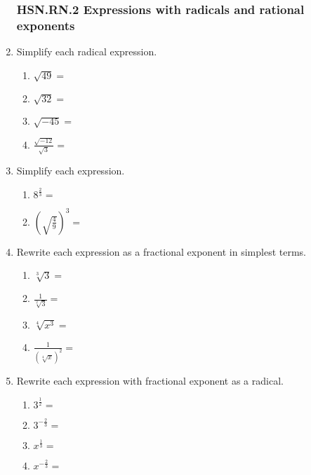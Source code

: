 \documentclass[12pt, twoside]{article}
\begin{document}
\begin{enumerate}[itemsep=0.5cm]
\subsubsection*{HSN.RN.2 Expressions with radicals and rational exponents}
\item Simplify each radical expression.
    \begin{multicols}{2}
    \begin{enumerate}[itemsep=0.5cm]
        \item $\sqrt{49}=$
        \item $\sqrt{32}=$
        \item $\sqrt{-45}=$
        \item $\displaystyle \frac{\sqrt{-12}}{\sqrt{3}}=$
    \end{enumerate}
    \end{multicols} \vspace{1cm}
    
\item Simplify each expression.
    \begin{multicols}{2}
    \begin{enumerate}[itemsep=0.5cm]
        \item $\displaystyle 8^{\frac{2}{3}} =$
        \item $\left( \sqrt{\frac{4}{9}} \right)^{3} =$
    \end{enumerate}
    \end{multicols} \vspace{2cm}

    
\item Rewrite each expression as a fractional exponent in simplest terms.
    \begin{multicols}{2}
      \begin{enumerate}[itemsep=1cm]
          \item $\sqrt[3]{3} =$
          \item $\displaystyle \frac{1}{\sqrt[2]{3}}=$
          \item $\sqrt[4]{x^3} =$
          \item $\displaystyle \frac{1}{(\sqrt[4]{x})^2}=$
      \end{enumerate}
      \end{multicols} \vspace{1cm}
  
\item Rewrite each expression with fractional exponent as a radical.
    \begin{multicols}{2}
      \begin{enumerate}[itemsep=1cm]
        \item $\displaystyle 3^{\frac{1}{2}}=$
        \item $\displaystyle 3^{-\frac{2}{3}}=$
        \item $\displaystyle x^{\frac{1}{3}}=$
        \item $\displaystyle x^{-\frac{2}{3}}=$
      \end{enumerate}
      \end{multicols}


\end{enumerate}
\end{document}
